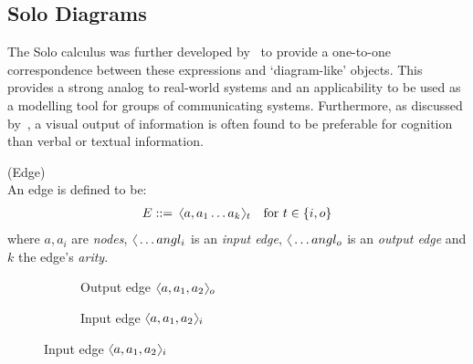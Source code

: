 \subsection{Solo Diagrams}
    The Solo calculus was further developed by~\cite{solo-diagrams} to provide a one-to-one correspondence between these  expressions and `diagram-like' objects.
    This provides a strong analog to real-world systems and an applicability to be used as a modelling tool for groups of communicating systems.
    Furthermore, as discussed by~\cite{learning-styles}, a visual output of information is often found to be preferable for cognition than verbal or textual information.


    \begin{definition}{(Edge)\\}
        An edge is defined to be:
        \begin{align*}
            E \defeq \, \langl a, a_1 \ldots a_k\rangl_t \quad \text{for } t \in \{ i, o \}
        \end{align*}
        where $a, a_i$ are \textit{nodes}, $\langl\ldots angl_i$ is an \textit{input edge}, $\langl\ldots angl_o$ is an \textit{output edge} and $k$ the edge's \textit{arity}.
    \end{definition}

    \begin{figure}[H]
        \centering
        \begin{subfigure}{0.4\linewidth}
            \centering
            \caption*{Output edge $\langl a, a_1, a_2\rangl_o$}
        \end{subfigure}
        \begin{subfigure}{0.4\linewidth}
            \centering
            \caption*{Input edge $\langl a, a_1, a_2\rangl_i$}
        \end{subfigure}
    \end{figure}

